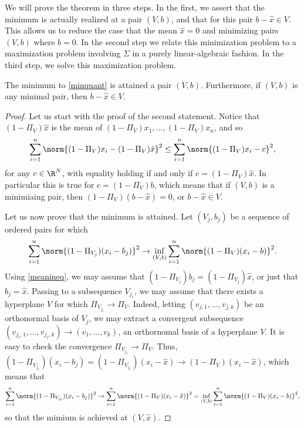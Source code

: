 \documentclass[12pt]{article}
\begin{document}
We will prove the theorem in three steps. In the first, we assert that the minimum is actually realized at a pair $(V,b)$, and that for this pair $b - \hat{x} \in V$. This allows us to reduce the case that the mean $\hat{x} = 0$ and minimizing pairs $(V,b)$ where $b = 0$. In the second step we relate this minimization problem to a maximization problem involving $\Sigma$ in a purely linear-algebraic fashion. In the third step, we solve this maximization problem.

\begin{lem}The minimum to \eqref{minquant} is attained a pair $(V,b)$. Furthermore, if $(V,b)$ is any minimal pair, then $b - \hat{x} \in V$.\end{lem}
\begin{proof}Let us start with the proof of the second statement. Notice that $(1-\Pi_V)\hat{x}$ is the mean of $(1-\Pi_V)x_1,\ldots,(1-\Pi_V)x_n$, and so
\begin{equation}\label{meanineq}\sum_{i=1}^n \norm{(1-\Pi_V)x_i - (1-\Pi_V)\hat{x}}^2 \leq \sum_{i=1}^n \norm{(1-\Pi_V)x_i - c}^2,\end{equation} for any $c \in \R^N$, with equality holding if and only if $c = (1-\Pi_V)\hat{x}$. In particular this is true for $c = (1-\Pi_V)b$, which means that if $(V,b)$ is a minimiaing pair, then $(1-\Pi_V)(b-\hat{x}) = 0$, or $b-\hat{x} \in V$.

Let us now prove that the minimum is attained. Let $(V_j,b_j)$ be a sequence of ordered pairs for which
 \[\sum_{i=1}^n \norm{(1-\Pi_{V_j})(x_i-b_j)}^2 \to \inf_{(V,b)}\sum_{i=1}^n \norm{(1-\Pi_{V})(x_i-b)}^2.\] Using \eqref{meanineq}, we may assume that $(1-\Pi_{V_j})b_j = (1-\Pi_{V_j})\hat{x}$, or just that $b_j = \hat{x}$. Passing to a subsequence $V_{j_\ell}$, we may assume that there exists a hyperplane $V$ for which $\Pi_{V_{j_\ell}} \to \Pi_V$. Indeed, letting $(v_{j,1},\ldots,v_{j,k})$ be an orthonormal basis of $V_j$, we may extract a convergent subsequence $(v_{j_\ell,1},\ldots,v_{j_\ell,k}) \to (v_1,\ldots,v_k)$, an orthornomal basis of a hyperplane $V$. It is easy to check the convergence $\Pi_{V_{j_\ell}} \to \Pi_V$. Thus, $(1-\Pi_{V_{j_\ell}})(x_i-b_j) = (1-\Pi_{V_{j_\ell}})(x_i-\hat{x}) \to (1-\Pi_V)(x_i-\hat{x})$, which means that
 \[\sum_{i=1}^n \norm{(1-\Pi_{V_{j_\ell}})(x_i-b_j)}^2  \to \sum_{i=1}^n \norm{(1-\Pi_V)(x_i-\hat{x})}^2 = \inf_{(V,b)}\sum_{i=1}^n \norm{(1-\Pi_{V})(x_i-b)}^2,\]
 so that the mimium is achieved at $(V,\hat{x})$.
 \end{proof}
 
\end{document}

